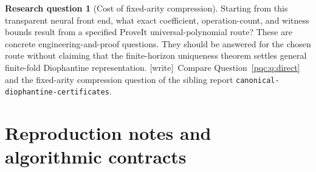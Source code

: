 \documentclass[11pt,letterpaper]{article}
\numberwithin{equation}{section}
\theoremstyle{definition}
\newtheorem{question}{Research question}
\theoremstyle{remark}
\newcommand{\code}[1]{\nolinkurl{#1}}
\newcommand{\wtag}{\textup{[write]}}
\begin{document}
\begin{question}[Cost of fixed-arity compression]
Starting from this transparent neural front end, what exact coefficient,
operation-count, and witness bounds result from a specified ProveIt
universal-polynomial route? These are concrete engineering-and-proof
questions. They should be answered for the chosen route without claiming
that the finite-horizon uniqueness theorem settles general finite-fold
Diophantine representation.
\wtag\ Compare Question~\ref{pqc:q:direct} and the fixed-arity compression question of the sibling report \code{canonical-diophantine-certificates}.
\end{question}



\appendix
\section{Reproduction notes and algorithmic contracts}
\label{pqc:app:archive}
\end{document}
